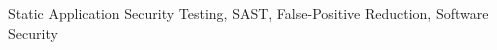 \documentclass[conference]{IEEEtran}
\begin{document}
\begin{IEEEkeywords}
Static Application Security Testing, SAST, False-Positive Reduction, Software
Security
\end{IEEEkeywords}










\end{document}
